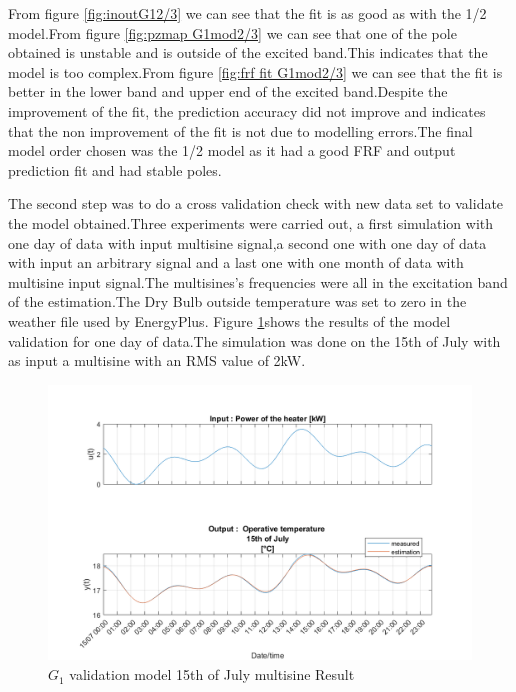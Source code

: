 \documentclass[a4paper,12pt]{article}
\numberwithin{equation}{section}
\begin{document}
\noindent
From figure \ref{fig:inoutG12/3} we can see that the fit is as good as with the 1/2 model.From figure \ref{fig:pzmap G1mod2/3} we can see that one of the pole obtained is unstable and is outside of the excited band.This indicates that the model is too complex.From figure \ref{fig:frf fit G1mod2/3} we can see that the fit is better in the lower band and upper end of the excited band.Despite the improvement of the fit, the prediction accuracy did not improve and indicates that the non improvement of the fit is not due to modelling errors.The final model order chosen was the 1/2 model as it had a good FRF and output prediction fit and had stable poles.

The second step was to do a cross validation check with new data set to validate the model obtained.Three  experiments were carried out, a first simulation with one day of data with input multisine signal,a second one with one day of data with input an arbitrary signal and a last one with one month of data with multisine input signal.The multisines's frequencies were all in the excitation band of the estimation.The Dry Bulb outside temperature was set to zero in the weather file used by EnergyPlus. Figure \ref{fig:G1onedayValidation15/07}shows the results of the model validation for one day of data.The simulation was done on the 15th of July with as input a multisine with an RMS value of 2kW.

\begin{figure}[H]
    \includegraphics[width=\textwidth]{G1_15_07_MS.png}
    \centering
    \caption{$G_{1}$ validation model 15th of July multisine Result}
    \label{fig:G1onedayValidation15/07}
\end{figure}
\end{document}
